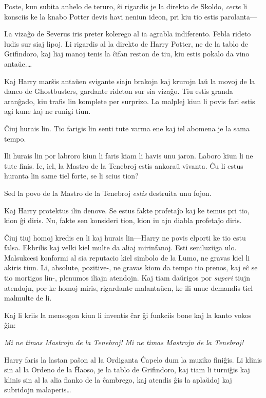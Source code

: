 Poste, kun subita anhelo de teruro, ŝi rigardis je la direkto de
Skoldo, \emph{certe} li konsciis ke la knabo Potter devis havi neniun
ideon, pri kiu tio estis parolanta—

La vizaĝo de Severus iris preter kolerego al ia agrabla
indiferento. Febla rideto ludis sur siaj lipoj. Li rigardis al la
direkto de Harry Potter, ne de la tablo de Grifindoro, kaj liaj manoj
tenis la ĉifan reston de tiu, kiu estis pokalo da vino antaŭe.\ldots

Kaj Harry marŝis antaŭen svigante siajn brakojn kaj krurojn laŭ la
movoj de la danco de Ghostbusters, gardante rideton sur sia
vizaĝo. Tiu estis granda aranĝado, kiu trafis lin komplete per
surprizo. La malplej kiun li povis fari estis agi kune kaj ne runigi
tiun.

Ĉiuj hurais lin. Tio farigis lin senti tute varma ene kaj iel abomena
je la sama tempo.

Ili hurais lin por labroro kiun li faris kiam li havis unu
jaron. Laboro kiun li ne tute finis. Ie, iel, la Mastro de la Tenebroj
estis ankoraŭ vivanta. Ĉu li estus huranta lin same tiel forte, se li
scius tion?

Sed la povo de la Mastro de la Tenebroj \emph{estis} destruita unu
fojon.

Kaj Harry protektus ilin denove. Se estus fakte profetaĵo kaj ke temus
pri tio, kion ĝi diris. Nu, fakte sen konsideri tion, kion iu ajn
diabla profetaĵo diris.

Ĉiuj tiuj homoj kredis en li kaj hurais lin—Harry ne povis elporti ke
tio estu falsa. Ekbrilis kaj velki kiel multe da aliaj
mirinfanoj. Esti seniluziiga ulo. Malsukcesi konformi al sia reputacio
kiel simbolo de la Lumo, ne gravas kiel li akiris tiun. Li, absolute,
pozitive-, ne gravas kiom da tempo tio prenos, kaj eĉ se tio mortigos
lin-, plenumos iliajn atendojn. Kaj tiam daŭrigos por \emph{superi}
tiujn atendojn, por ke homoj miris, rigardante malantaŭen, ke ili unue
demandis tiel malmulte de li.

Kaj li kriis la mensogon kiun li inventis ĉar ĝi funkciis bone kaj la
kanto vokos ĝin:

\emph{Mi ne timas Mastrojn de la Tenebroj! Mi ne timas Mastrojn de la Tenebroj!}

Harry faris la lastan paŝon al la Ordiganta Ĉapelo dum la muziko
finiĝis. Li klinis sin al la Ordeno de la Ĥaoso, je la tablo de
Grifindoro, kaj tiam li turniĝis kaj klinis sin al la alia flanko de
la ĉambrego, kaj atendis ĝis la aplaŭdoj kaj subridojn malaperis\ldots

